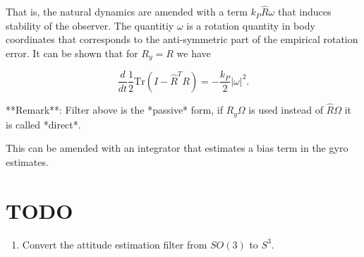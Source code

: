 That is, the natural dynamics are amended with a term $k_P \hat R \omega$ that induces stability of the observer. The quantitiy $\omega$ is a rotation quantity in body coordinates that corresponds to the anti-symmetric part of the empirical rotation error. It can be shown that for $R_y = R$ we have

$$
  \frac{d}{d t} \frac{1}{2} \text{Tr} \left( I - \hat R^T R \right) = -\frac{k_P}{2} |\omega|^2.
$$

**Remark**: Filter above is the *passive* form, if $R_y \Omega$ is used instead of $\hat R \Omega$ it is called *direct*.

This can be amended with an integrator that estimates a bias term in the gyro estimates.
\section{TODO}

\begin{enumerate}
  \item Convert the attitude estimation filter from $SO(3)$ to $S^3$.
\end{enumerate}